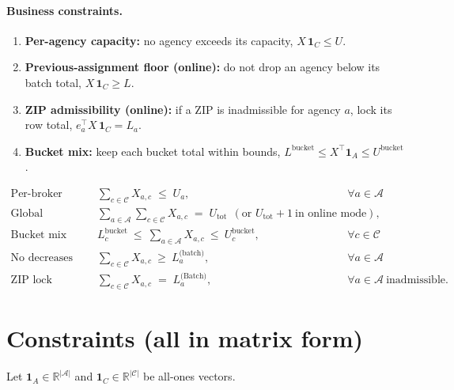 \documentclass[11pt]{article}
\newcommand{\A}{\mathcal{A}}                 %
\newcommand{\C}{\mathcal{C}}                 %
\newcommand{\R}{\mathbb{R}}
\begin{document}
\paragraph{Business constraints.}
\begin{enumerate}[leftmargin=*]
\item \textbf{Per-agency capacity:} no agency exceeds its capacity,
$X\,\mathbf{1}_C \le U$.
\item \textbf{Previous-assignment floor (online):} do not drop an agency below its
batch total, $X\,\mathbf{1}_C \ge L$.
\item \textbf{ZIP admissibility (online):} if a ZIP is inadmissible for agency $a$,
lock its row total, $e_a^\top X\,\mathbf{1}_C=L_a$.
\item \textbf{Bucket mix:} keep each bucket total within bounds,
$L^{\text{bucket}} \le X^\top \mathbf{1}_A \le U^{\text{bucket}}$.
\end{enumerate}

\begin{align*}
\text{Per-broker capacity:}\quad
& \sum_{c\in\C} X_{a,c} \;\le\; U_a,
& \forall a\in\A
\\[4pt]
\text{Global conservation:}\quad
& \sum_{a\in\A}\sum_{c\in\C} X_{a,c} \;=\; U_{\mathrm{tot}}
\ \ (\text{or }U_{\mathrm{tot}}+1\ \text{in online mode}),
\\[4pt]
\text{Bucket mix (optional):}\quad
& L^{\text{bucket}}_c \ \le\ \sum_{a\in\A} X_{a,c}\ \le\ U^{\text{bucket}}_c,
& \forall c\in\C
\\[4pt]
\text{No decreases (online):}\quad
& \sum_{c\in\C} X_{a,c} \ \ge\ L^{\text{(batch)}}_a,
& \forall a\in\A
\\[4pt]
\text{ZIP lock (online, if inadmissible):}\quad
& \sum_{c\in\C} X_{a,c} \;=\; L^{\text{(Batch)}}_a,
& \forall a\in\A\ \text{inadmissible.}
\end{align*}

\section{Constraints (all in matrix form)}

Let $\mathbf{1}_A\in\R^{|\A|}$ and $\mathbf{1}_C\in\R^{|\C|}$ be all-ones vectors.
\end{document}
